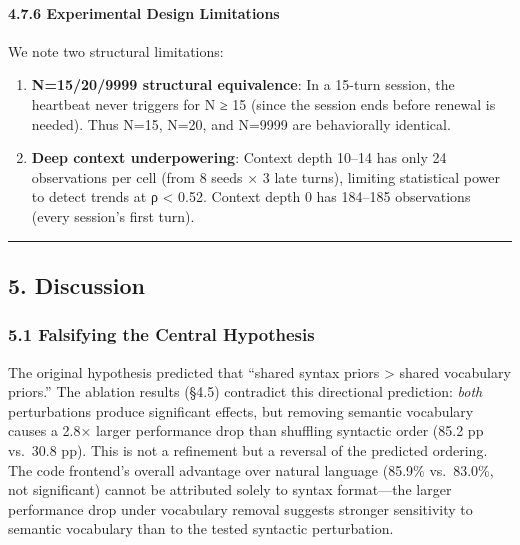 \paragraph{4.7.6 Experimental Design Limitations}\label{experimental-design-limitations}



We note two structural limitations:



\begin{enumerate}

\def\labelenumi{\arabic{enumi}.}

\tightlist

\item

  \textbf{N=15/20/9999 structural equivalence}: In a 15-turn session, the heartbeat never triggers for N ≥ 15 (since the session ends before renewal is needed). Thus N=15, N=20, and N=9999 are behaviorally identical.

\item

  \textbf{Deep context underpowering}: Context depth 10--14 has only 24 observations per cell (from 8 seeds × 3 late turns), limiting statistical power to detect trends at \textbar ρ\textbar{} \textless{} 0.52. Context depth 0 has 184--185 observations (every session's first turn).

\end{enumerate}



\begin{center}\rule{0.5\linewidth}{0.5pt}\end{center}



\subsection{5. Discussion}\label{discussion}



\subsubsection{5.1 Falsifying the Central Hypothesis}\label{falsifying-the-central-hypothesis}



The original hypothesis predicted that ``shared syntax priors \textgreater{} shared vocabulary priors.'' The ablation results (§4.5) contradict this directional prediction: \emph{both} perturbations produce significant effects, but removing semantic vocabulary causes a 2.8× larger performance drop than shuffling syntactic order (85.2 pp vs.~30.8 pp). This is not a refinement but a reversal of the predicted ordering. The code frontend's overall advantage over natural language (85.9\% vs.~83.0\%, not significant) cannot be attributed solely to syntax format---the larger performance drop under vocabulary removal suggests stronger sensitivity to semantic vocabulary than to the tested syntactic perturbation.




